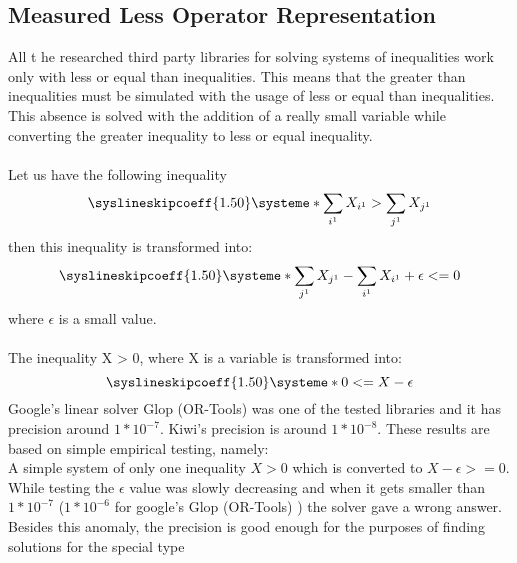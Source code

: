 \documentclass{article}
\begin{document}
	\subsection{Measured Less Operator Representation}
	All t	he researched third party libraries for solving systems of inequalities work only with less or equal than inequalities.
		This means that the greater than inequalities must be simulated with the usage of less or equal than inequalities.
		\newline
		This absence is solved with the addition of a really
		small variable while converting the greater inequality to 
		less or equal inequality.
		\\
		\\
		Let us have the following inequality
		\[
			\syslineskipcoeff{1.50}
			\systeme*{\sum_{i^1} X_{i^1} > \sum_{j^1} X_{j^1}}
		\]
		then this inequality is transformed into:
		\[
			\syslineskipcoeff{1.50}
			\systeme*{\sum_{j^1} X_{j^1} - \sum_{i^1} X_{i^1} + \epsilon <= 0}
		\]
		where $\epsilon$ is a small value.
		\\
		\\
		The inequality X > 0, where X is a variable is transformed into:
		\[
			\syslineskipcoeff{1.50}
			\systeme*{0 <= X - \epsilon} 
		\]
		\newline
		Google's linear solver Glop (OR-Tools) was one of the tested libraries and it has precision around $1*10^{-7}$.
		Kiwi's precision is around $1*10^{-8}$. 
		\newline
		These results are based on simple empirical testing, namely:
		\\
		\noindent
		A simple system of only one inequality $X > 0$ which is converted to $X - \epsilon >= 0$. 
		While testing the $\epsilon$ value was slowly decreasing and when it gets smaller than $1*10^{-7}$
		($1*10^{-6}$ for google's Glop (OR-Tools) ) the solver gave a wrong answer.
		\newline
		\newline
		Besides this anomaly, the precision is good enough for the purposes of finding solutions for the special type
\end{document}
